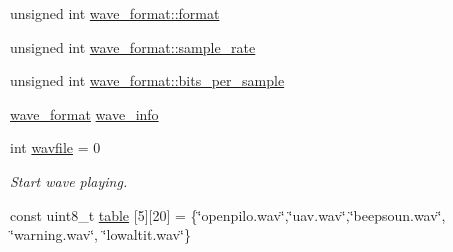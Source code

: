 \begin{DoxyCompactItemize}
\item 
unsigned int \hyperlink{group___w_a_v_e_p_l_a_y_e_r___private___variables_ga9d1757773fade2368a9707940f73a817}{wave\-\_\-format\-::format}
\item 
unsigned int \hyperlink{group___w_a_v_e_p_l_a_y_e_r___private___variables_gac4e6a65b9847e9764ced1595404b75fe}{wave\-\_\-format\-::sample\-\_\-rate}
\item 
unsigned int \hyperlink{group___w_a_v_e_p_l_a_y_e_r___private___variables_gad262ae00b4298e98bbbd565de116f390}{wave\-\_\-format\-::bits\-\_\-per\-\_\-sample}
\item 
\hyperlink{structwave__format}{wave\-\_\-format} \hyperlink{group___w_a_v_e_p_l_a_y_e_r___private___variables_ga174829d299c4713257749f20bfc996f4}{wave\-\_\-info}
\item 
int \hyperlink{group___w_a_v_e_p_l_a_y_e_r___private___variables_ga9fe4a9e502dfc977283819847ecc2351}{wavfile} = 0
\begin{DoxyCompactList}\small\item\em \-Start wave playing. \end{DoxyCompactList}\item 
const uint8\-\_\-t \hyperlink{group___w_a_v_e_p_l_a_y_e_r___private___variables_gacad7ec90c8f694c87a4695350cb98d5d}{table} \mbox{[}5\mbox{]}\mbox{[}20\mbox{]} = \{\char`\"{}openpilo.\-wav\char`\"{},\char`\"{}uav.\-wav\char`\"{},\char`\"{}beepsoun.\-wav\char`\"{}, \char`\"{}warning.\-wav\char`\"{}, \char`\"{}lowaltit.\-wav\char`\"{}\}
\end{DoxyCompactItemize}


